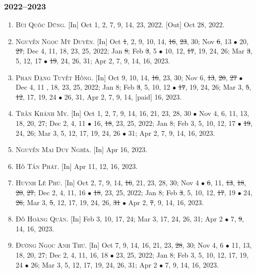 \documentclass{article}
\begin{document}
\subsubsection{2022--2023}

\begin{enumerate}
	\item \textsc{Bùi Quốc Dũng.} \textsf{[In]} Oct 1, 2, 7, 9, 14, 23, 2022. \textsf{[Out]} Oct 28, 2022.
	\item \textsc{Nguyễn Ngọc Mỹ Duyên.} \textsf{[In]} Oct \st{1}, 2, 9, 10, 14, \st{16}, \st{23}, 30; Nov \st{6}, 13 $\bullet$ 20, \st{27}; Dec 4, 11, 18, 23, 25, 2022; Jan \st{8}; Feb \st{3}, 5 $\bullet$ 10, 12, \st{17}, 19, 24, 26; Mar \st{3}, 5, 12, 17 $\bullet$ \st{19}, 24, 26, 31; Apr 2, 7, 9, 14, 16, 2023.
	\item \textsc{Phan Đặng Tuyết Hồng.} \textsf{[In]} Oct 9, 10, 14, \st{16}, 23, 30; Nov 6, \st{13}, \st{20}, \st{27} $\bullet$ Dec 4, 11 , 18, 23, 25, 2022; Jan 8; Feb \st{3}, 5, 10, 12 $\bullet$ \st{17}, 19, 24, 26; Mar 3, \st{5}, \st{12}, 17, 19, 24 $\bullet$ 26, 31, Apr 2, 7, 9, 14, [paid] 16, 2023.
	\item \textsc{Trần Khánh My.} \textsf{[In]} Oct 1, 2, 7, 9, 14, 16, 21, 23, 28, 30 $\bullet$ Nov 4, 6, 11, 13, 18, 20, 27; Dec 2, 4, 11 $\bullet$ 16, \st{18}, 23, 25, 2022; Jan 8; Feb 3, 5, 10, 12, 17 $\bullet$ \st{19}, 24, 26; Mar 3, 5, 12, 17, 19, 24, 26 $\bullet$ 31; Apr 2, 7, 9, 14, 16, 2023.
	\item \textsc{Nguyễn Mai Duy Nghĩa.} \textsf{[In]} Apr 16, 2023.
	\item \textsc{Hồ Tấn Phát.} \textsf{[In]} Apr 11, 12, 16, 2023.
	\item \textsc{Huỳnh Lê Phú.} \textsf{[In]} Oct 2, 7, 9, 14, \st{16}, 21, 23, 28, 30; Nov 4 $\bullet$ \st{6}, 11, \st{13}, \st{18}, \st{20}, \st{27}; Dec 2, 4, 11, 16 $\bullet$ \st{18}, 23, 25, 2022; Jan 8; Feb \st{3}, 5, 10, 12, \st{17}, 19 $\bullet$ 24, \st{26}; Mar 3, \st{5}, 12, 17, 19, 24, 26, \st{31} $\bullet$ Apr 2, \st{7}, 9, 14, 16, 2023.
	\item \textsc{Đỗ Hoàng Quân.} \textsf{[In]} Feb 3, 10, 17, 24; Mar 3, 17, 24, 26, 31; Apr 2 $\bullet$ 7, \st{9}, 14, 16, 2023.
	\item \textsc{Đường Ngọc Anh Thư.} \textsf{[In]} Oct 7, 9, 14, 16, 21, 23, \st{28}, 30; Nov 4, 6 $\bullet$ 11, 13, 18, 20, 27; Dec 2, 4, 11, 16, 18 $\bullet$ 23, 25, 2022; Jan 8; Feb 3, 5, 10, 12, 17, 19, 24 $\bullet$ 26; Mar 3, 5, 12, 17, 19, 24, 26, 31; Apr 2 $\bullet$ 7, 9, 14, 16, 2023.
\end{enumerate}
\end{document}
